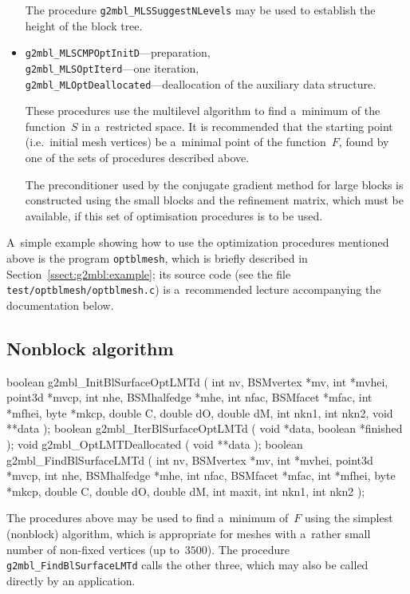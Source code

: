 \begin{itemize}
    The procedure \texttt{g2mbl\_MLSSuggestNLevels} may be used to establish
    the height of the block tree.
  \item \texttt{g2mbl\_MLSCMPOptInitD}---preparation, \\
    \texttt{g2mbl\_MLSOptIterd}---one iteration, \\
    \texttt{g2mbl\_MLOptDeallocated}---deallocation of the auxiliary data
      structure.

    These procedures use the multilevel algorithm to find a~minimum of the
    function~$S$ in a~restricted space. It is recommended that the starting
    point (i.e.\ initial mesh vertices) be a~minimal point of the
    function~$F$, found by one of the sets of procedures described above.

    The preconditioner used by the conjugate gradient method for large
    blocks is constructed using the small blocks and the refinement matrix,
    which must be available, if this set of optimisation procedures is to be
    used.
\end{itemize}

A~simple example showing how to use the optimization procedures mentioned
above is the program \texttt{optblmesh}, which is briefly described in
Section~\ref{ssect:g2mbl:example}; its source code (see the file
\texttt{test/optblmesh/optblmesh.c}) is a~recommended lecture accompanying
the documentation below.


\subsection{\label{ssect:g2mbl:nonblock}Nonblock algorithm}

\begin{listingC}
boolean g2mbl_InitBlSurfaceOptLMTd (
                    int nv, BSMvertex *mv, int *mvhei,
                    point3d *mvcp, int nhe, BSMhalfedge *mhe,
                    int nfac, BSMfacet *mfac, int *mfhei,
                    byte *mkcp,
                    double C, double dO, double dM,
                    int nkn1, int nkn2, void **data );
boolean g2mbl_IterBlSurfaceOptLMTd ( void *data, boolean *finished );  
void g2mbl_OptLMTDeallocated ( void **data );
boolean g2mbl_FindBlSurfaceLMTd ( int nv, BSMvertex *mv, int *mvhei,   
                          point3d *mvcp, int nhe, BSMhalfedge *mhe,
                          int nfac, BSMfacet *mfac, int *mfhei,
                          byte *mkcp,
                          double C, double dO, double dM,
                          int maxit, int nkn1, int nkn2 );
\end{listingC}
The procedures above may be used to find a~minimum of~$F$ using the simplest
(nonblock) algorithm, which is appropriate for meshes with a~rather small
number of non-fixed vertices (up to~$3500$). The procedure
\texttt{g2mbl\_FindBlSurfaceLMTd} calls the other three, which may also be
called directly by an application.

